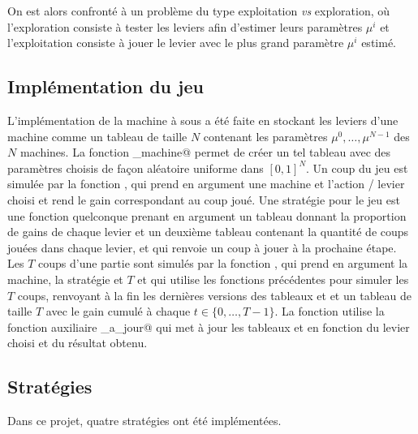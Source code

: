 \documentclass[a4paper,11pt]{article}
\begin{document}
On est alors confronté à un problème du type exploitation \emph{vs} exploration, où l'exploration consiste à tester les leviers afin d'estimer leurs paramètres $\mu^i$ et l'exploitation consiste à jouer le levier avec le plus grand paramètre $\mu^i$ estimé.

\subsection{Implémentation du jeu}
\label{SecImplementation}

L'implémentation de la machine à sous a été faite en stockant les leviers d'une machine comme un tableau de taille $N$ contenant les paramètres $\mu^0, \dots, \mu^{N-1}$ des $N$ machines. La fonction \verb@cree_machine@ permet de créer un tel tableau avec des paramètres choisis de façon aléatoire uniforme dans $[0, 1]^N$. Un coup du jeu est simulée par la fonction \verb@jouer@, qui prend en argument une machine et l'action / levier choisi et rend le gain correspondant au coup joué. Une stratégie pour le jeu est une fonction quelconque prenant en argument un tableau \verb@mu@ donnant la proportion de gains de chaque levier et un deuxième tableau \verb@Na@ contenant la quantité de coups jouées dans chaque levier, et qui renvoie un coup à jouer à la prochaine étape. Les $T$ coups d'une partie sont simulés par la fonction \verb@run@, qui prend en argument la machine, la stratégie et $T$ et qui utilise les fonctions précédentes pour simuler les $T$ coups, renvoyant à la fin les dernières versions des tableaux \verb@mu@ et \verb@Na@ et un tableau de taille $T$ avec le gain cumulé à chaque $t \in \{0, \dotsc, T-1\}$. La fonction \verb@run@ utilise la fonction auxiliaire \verb@mise_a_jour@ qui met à jour les tableaux \verb@mu@ et \verb@Na@ en fonction du levier choisi et du résultat obtenu.

\subsection{Stratégies}
\label{SecStrategies}

Dans ce projet, quatre stratégies ont été implémentées.
\end{document}

